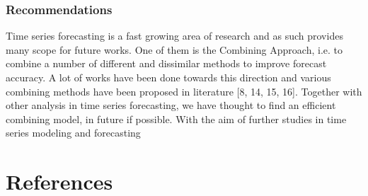 \documentclass[10pt]{report}
\begin{document}
\begin{flushleft}
		\subsubsection{Recommendations}
		Time series forecasting is a fast growing area of research and as such provides many scope for future works. One of them is the Combining Approach, i.e. to combine a number of different and dissimilar methods to improve forecast accuracy. A lot of works have been done towards this direction and various combining methods have been proposed in literature [8, 14, 15, 16]. 
		Together with other analysis in time series forecasting, we have thought to find an efficient combining model, in future if possible. With the aim of further studies in time series modeling and forecasting
		\section{References}
	\end{flushleft}
\end{document}
